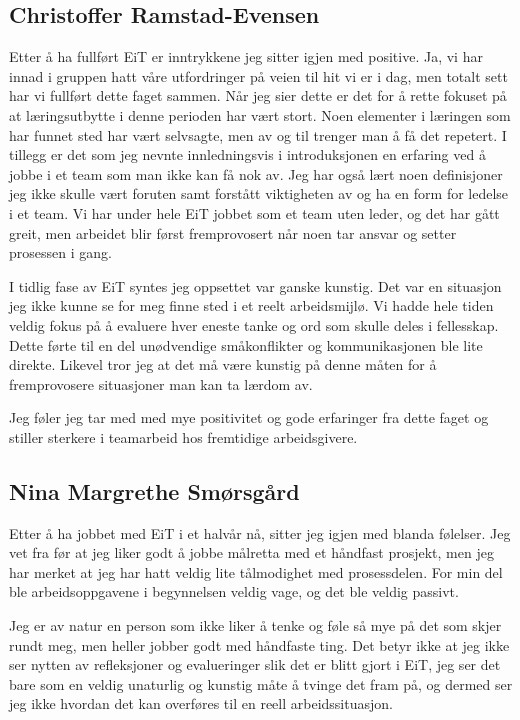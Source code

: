 \subsection*{Christoffer Ramstad-Evensen}
Etter å ha fullført EiT er inntrykkene jeg sitter igjen med positive. Ja, vi har innad i gruppen hatt våre utfordringer
på veien til hit vi er i dag, men totalt sett har vi fullført dette faget sammen. Når jeg sier dette er det for å rette 
fokuset på at læringsutbytte i denne perioden har vært stort. Noen elementer i læringen som har funnet sted
har vært selvsagte, men av og til trenger man å få det repetert. I tillegg er det som jeg nevnte innledningsvis
i introduksjonen en erfaring ved å jobbe i et team som man ikke kan få nok av. Jeg har også lært noen 
definisjoner jeg ikke skulle vært foruten samt forstått viktigheten av og ha en form for ledelse i et team. 
Vi har under hele EiT jobbet som et team uten leder, og det har gått greit, men arbeidet blir først fremprovosert
når noen tar ansvar og setter prosessen i gang. 

I tidlig fase av EiT syntes jeg oppsettet var ganske kunstig. Det var en situasjon jeg ikke kunne se for meg
finne sted i et reelt arbeidsmijlø. Vi hadde hele tiden veldig fokus på å evaluere hver eneste tanke og ord som
skulle deles i fellesskap. Dette førte til en del unødvendige småkonflikter og kommunikasjonen ble lite direkte. 
Likevel tror jeg at det må være kunstig på denne måten for å fremprovosere situasjoner man kan ta lærdom av.

Jeg føler jeg tar med med mye positivitet og gode erfaringer fra dette faget og stiller sterkere i teamarbeid hos
fremtidige arbeidsgivere.

\subsection*{Nina Margrethe Smørsgård}
Etter å ha jobbet med EiT i et halvår nå, sitter jeg igjen med blanda følelser. 
Jeg vet fra før at jeg liker godt å jobbe målretta med et håndfast prosjekt, men jeg 
har merket at jeg har hatt veldig lite tålmodighet med prosessdelen. For 
min del ble arbeidsoppgavene i begynnelsen veldig vage, og det ble veldig passivt.

Jeg er av natur en person som ikke liker å tenke og føle så mye på det som skjer 
rundt meg, men heller jobber godt med håndfaste ting. Det betyr ikke at jeg ikke ser 
nytten av refleksjoner og evalueringer slik det er blitt gjort i EiT, jeg ser det 
bare som en veldig unaturlig og kunstig måte å tvinge det fram på, og dermed ser 
jeg ikke hvordan det kan overføres til en reell arbeidssituasjon.

